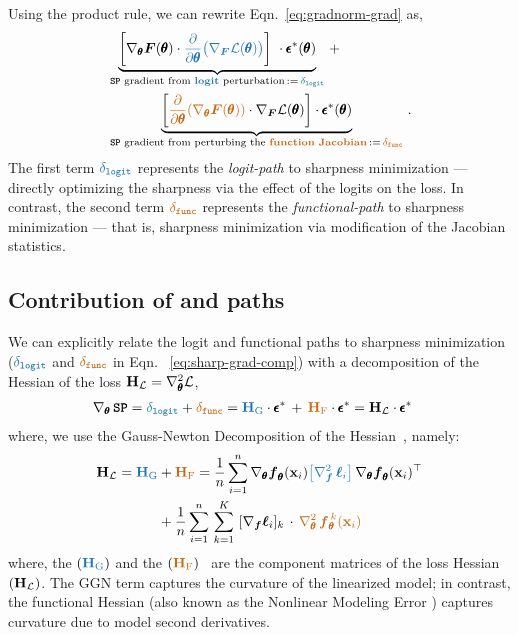 Using the product rule, we
can rewrite Eqn.~\ref{eq:gradnorm-grad} as, 
\begin{align}\label{eq:sharp-grad-comp}
&     \underbrace{\left\lbrack \nabla_\btheta \boldsymbol{F}(\btheta)\cdot \lcolor{\frac{\partial  }{\partial \btheta} \big(\nabla_{\boldsymbol{F}} \Loss(\btheta)\big)} \right\rbrack\,\,\cdot \beps^\ast(\btheta)}_{\spcolor{\SP} \text{ gradient from \textbf{\lcolor{logit}} perturbation}\,:=\,\lcolor{\glog}} \, + \,\nonumber\\
    &   \underbrace{\left\lbrack\fcolor{\frac{\partial  }{\partial \btheta} (\nabla_\btheta \boldsymbol{F}(\btheta))}\cdot \nabla_{\boldsymbol{F}} \Loss(\btheta)\right\rbrack\cdot \beps^\ast(\btheta)}_{\spcolor{\SP} \text{ gradient from perturbing the \fcolor{\textbf{function}} \textbf{\fcolor{Jacobian}}}\,:=\,\fcolor{\gfun}}\,.
\end{align}
The first term $\lcolor{\glog}$ represents the \emph{logit-path} to sharpness minimization --- directly optimizing the sharpness via the effect
of the logits on the loss.
In contrast, the second term $\fcolor{\gfun}$ represents the \textit{functional-path} to sharpness minimization --- that is, sharpness
minimization via modification of the Jacobian statistics.


\subsection{Contribution of  and  paths}
We can explicitly relate the logit and functional paths to sharpness minimization ($\lcolor{\glog}$ and $\fcolor{\gfun}$ in Eqn. ~\ref{eq:sharp-grad-comp})
with a decomposition of the Hessian of the loss $\textcolor{black}{{\mathbf{H}_{{\mathcal{L}}}}}=\nabla_{\pmb \theta}^2 {\mathcal{L}}$,
\begin{align}\label{eq:pen-grad}
    \spcolor{\nabla_\btheta \, \SP}&= \lcolor{\glog} + \fcolor{\gfun} = {\lcolor{\HG} \cdot \beps^\ast} \, +\, {\fcolor{\HF}\cdot  \beps^\ast} = \spcolor{\HL} \cdot \beps^\ast
\end{align}
where, we use the Gauss-Newton Decomposition of the Hessian~\citep{Schraudolph2002FastCM}, namely:
\begin{align}\label{eq:hess}
    \spcolor{\HL} =  \lcolor{\HG} &+ \fcolor{\HF} =  \frac{1}{\dataDim}\sum_{i=1}^{\dataDim} \nabla_\btheta \boldsymbol{f}_\btheta(\x_i) \lcolor{\big[\nabla^2_{\boldsymbol{f}} \,\ellbold_i\big]} \, \nabla_\btheta \boldsymbol{f}_\btheta(\x_i)^\top\nonumber\\
    &+ \frac{1}{\dataDim}\sum_{i=1}^{\dataDim} \,
    {\sum_{k=1}^K \,\, [\nabla_{\boldsymbol{f}}\ellbold_i]_k\,}  \cdot \,\fcolor{\nabla^2_\btheta \,\boldsymbol{f}^{\,{k}}_\btheta(\x_i)}\end{align}
where, the  $(\lcolor{\HG})$ and the  $(\fcolor{\HF})$~\citep{singh2021analytic,10.5555/3618408.3619732} are the component matrices of the loss Hessian $(\textcolor{black}{{\mathbf{H}_{{\mathcal{L}}}}})$.
The GGN term captures the curvature of the linearized model; in contrast, the functional Hessian (also known as the Nonlinear Modeling
Error \citep{dauphin2024neglected}) captures curvature due to model second derivatives.

